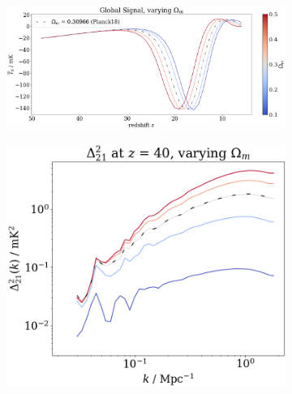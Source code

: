\documentclass[floats,floatfix,showpacs,amssymb,prd,superscriptaddress,nofootinbib, 11pt]{revtex4-2} %
\begin{document}
\begin{figure}[H]
     \centering
     \begin{subfigure}[b]{0.8\textwidth}
         \centering
         \includegraphics[width=\textwidth]{images/simulation_results/global_signal_Om.png}
         \label{fig:global_signal_Om}
     \end{subfigure}
     \hfill
     \begin{subfigure}[b]{0.45\textwidth}
         \centering
         \includegraphics[width=\textwidth]{images/simulation_results/power_spectrum_fixed_z_40_Om.png}
         \label{fig:power_spectrum_fixed_z_40_Om}
     \end{subfigure}
     \hfill
     \begin{subfigure}[b]{0.45\textwidth}
         \centering

\end{subfigure}
\end{figure}
\end{document}
